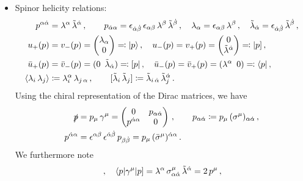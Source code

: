 \begin{itemize}
\begin{align*}
A_{(\mu}\, B_{\nu)} \coloneqq \frac{1}{2} \, ( A_{\mu} B_{\nu} + A_{\nu} B_{\mu})\, , \qquad
A_{[\mu}\, B_{\nu]} \coloneqq \frac{1}{2} \, ( A_{\mu} B_{\nu} - A_{\nu} B_{\mu})\, .
\end{align*}
%
\item Spinor helicity relations: 
\begin{align*}
p^{\a\da}&=\lambda^{\a}\, \tilde\lambda^{\da} \, ,  \qquad
p_{\da\a}=\epsilon_{\da\db}\, \epsilon_{\a\b}\, \lambda^{\b}\, \tilde\lambda^{\db}\, ,
\quad \la_{\a}=\epsilon_{\a\b}\,\la^{\b}\, ,
\quad \tla_{\da}=\epsilon_{\da\db}\,\tla^{\db}\, ,\nn\\
u_{+}(p)&= v_{-}(p)=    
\begin{pmatrix} %
      \la_{\alpha} \\
      0 \\
   \end{pmatrix}
   \eqqcolon |p\rangle\, ,\quad
u_{-}(p)= v_{+}(p)=    
\begin{pmatrix} %
      0 \\
      \tla^{\da} \\
   \end{pmatrix}
   \eqqcolon |p]\, , \nn\\
\bar u_{+}(p)&= \bar v_{-}(p) = (0\,\,\, \tla_{\da}) \eqqcolon [p| \, , \quad
   \bar u_{-}(p)= \bar v_{+}(p)  = (\la^{\a}\,\,\, 0) \eqqcolon \langle p| \, ,\nn \\
   \vev{\la_{i}\, \la_{j}} & \coloneqq \la_{i}^{\a}\, \la_{j\, \a}\, , \qquad
   \bev{\tla_{i}\, \tla_{j}} \coloneqq \tla_{i\,\da}\, \tla_{j}^{\da}\, .
   \end{align*}
Using the chiral representation of the Dirac matrices, we have
\begin{align*}
\slashed{p}  & = p_{\mu}\, \gamma^{\mu} =    \begin{pmatrix} 
      0 & p_{\alpha{\dot{\alpha}}} \\
      p^{{\dot{\alpha}}\alpha} & 0 \\
   \end{pmatrix}\,, \quad
   \quad
   p_{\alpha{\dot{\alpha}}} \coloneqq p_{\mu}\, (\sigma^{\mu})_{\alpha{\dot{\alpha}}}\, , \nonumber \\
   p^{{\dot{\alpha}}\alpha}&= \epsilon^{\alpha\beta}\, \epsilon^{{\dot{\alpha}}{\dot{\beta}}}\,  p_{\beta{\dot{\beta}}}= p_{\mu}\, (\bar\sigma^{\mu})^{{\dot{\alpha}}\alpha}\,.
\end{align*}
We furthermore note 
\begin{align*}
[i|\gamma^{\mu}| j\rangle &= \langle j | \gamma^{\mu}|i]\, ,\quad 
\langle p | \gamma^{\mu} | p] = \la^{\a}\, \sigma^{\mu}_{\a\da}\, \tla^{\da}= 2\, p^{\mu}\, , 

\end{align*}
\end{itemize}
